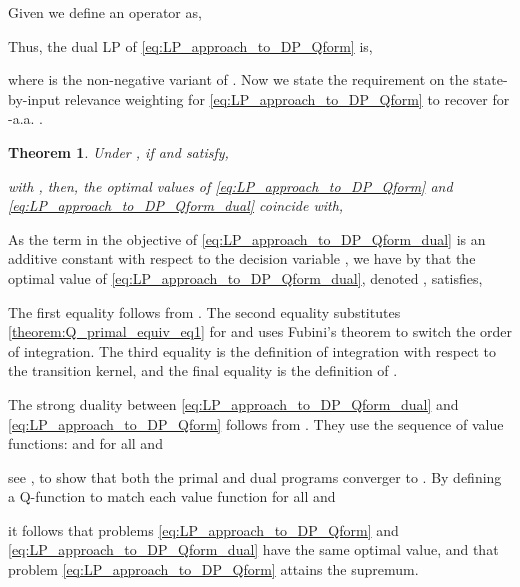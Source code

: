 \documentclass[journal]{IEEEtran}
\newtheorem{theorem}{Theorem}[section]
\newcommand{\textQ}{Q}
\begin{document}
Given  we define an operator  as,
	
Thus, the dual LP of \eqref{eq:LP_approach_to_DP_Qform} is,

where  is the non-negative variant of .
Now we state the requirement on the state-by-input relevance weighting for  \eqref{eq:LP_approach_to_DP_Qform} to recover  for -a.a. .

\vspace{0.1cm}

\begin{theorem} \label{theorem:Q_primal_equiv}
	Under \cite[Assumptions 4.2.1(a), 4.2.1(b), 4.2.2]{hernandez_2012_discreteTimeMCP}, if  and  satisfy,
		
	with , then,
the optimal values of \eqref{eq:LP_approach_to_DP_Qform} and \eqref{eq:LP_approach_to_DP_Qform_dual} coincide with,

\end{theorem}

\vspace{0.1cm}

\begin{IEEEproof}
	As the term  in the objective of \eqref{eq:LP_approach_to_DP_Qform_dual} is an additive constant with respect to the decision variable , we have by \cite[Theorem 6.3.7]{hernandez_2012_discreteTimeMCP} that the optimal value of \eqref{eq:LP_approach_to_DP_Qform_dual}, denoted , satisfies,
		
	The first equality follows from \cite[Theorem 6.3.7]{hernandez_2012_discreteTimeMCP}. The second equality substitutes \eqref{theorem:Q_primal_equiv_eq1} for  and uses Fubini's theorem to switch the order of integration. The third equality is the definition of integration with respect to the transition kernel, and the final equality is the definition of .
	
	The strong duality between \eqref{eq:LP_approach_to_DP_Qform_dual} and \eqref{eq:LP_approach_to_DP_Qform} follows from \cite[Theorem 6.3.8]{hernandez_2012_discreteTimeMCP}. They use the sequence of value functions:  and for all  and 
		
	see \cite[equation 6.3.38]{hernandez_2012_discreteTimeMCP}, to show that both the primal and dual programs converger to .
By defining a \textQ-function to match each value function for all  and 
		
	it follows that problems \eqref{eq:LP_approach_to_DP_Qform} and \eqref{eq:LP_approach_to_DP_Qform_dual} have the same optimal value, and that problem \eqref{eq:LP_approach_to_DP_Qform} attains the supremum.
\end{IEEEproof}
\end{document}
